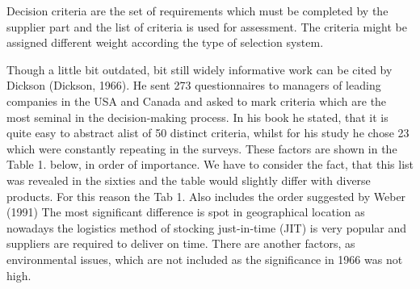 \documentclass[oneside,12pt]{article}%
\begin{document}
Decision criteria are the set of requirements which must be completed by the supplier part and the list of criteria is used for assessment. The criteria might be assigned different weight according the type of selection system. \par
Though a little bit outdated, bit still widely informative work can be cited by Dickson (Dickson, 1966). He sent 273 questionnaires to managers of leading companies in the USA and Canada and asked to mark criteria which are the most seminal in the decision-making process. In his book he stated, that it is quite easy to abstract alist of 50 distinct criteria, whilst for his study he chose 23 which were constantly repeating in the surveys. These factors are shown in the Table 1. below, in order of importance. We have to consider the fact, that this list was revealed in the sixties and the table would slightly differ with diverse products. For this reason the Tab 1. Also includes the order suggested by Weber (1991) The most significant difference is spot in geographical location as nowadays the logistics method of stocking just-in-time (JIT) is very popular and suppliers are required to deliver on time. There are another factors, as environmental issues, which are not included as the significance in 1966 was not high.
\end{document}
